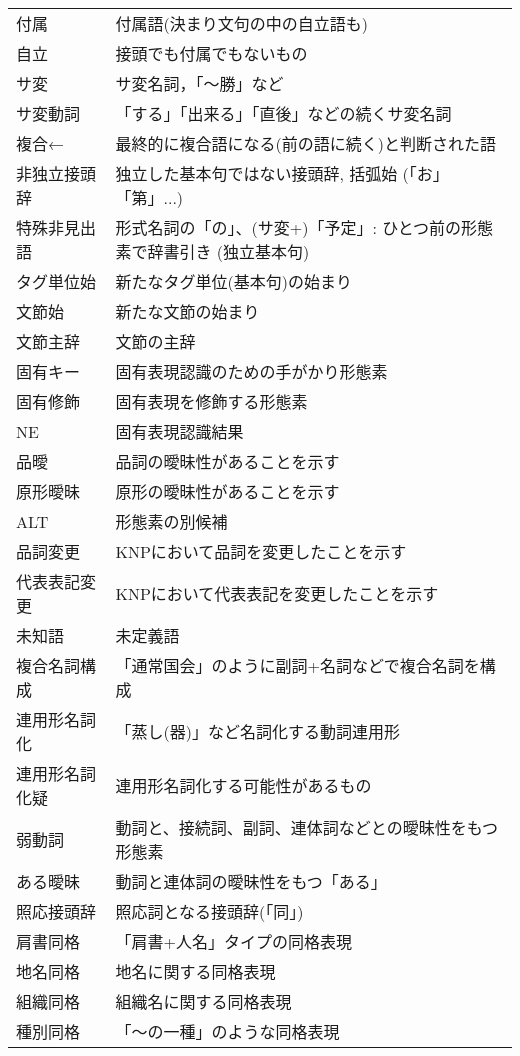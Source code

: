 \documentclass[a4j]{jarticle}
\begin{document}
\begin{supertabular}{p{4.2cm}p{9.6cm}}
付属 & 付属語(決まり文句の中の自立語も)\\
自立 & 接頭でも付属でもないもの\\
サ変 & サ変名詞，「〜勝」など\\
サ変動詞 & 「する」「出来る」「直後」などの続くサ変名詞\\
複合← &   最終的に複合語になる(前の語に続く)と判断された語\\
非独立接頭辞 & 独立した基本句ではない接頭辞, 括弧始 (「お」「第」...)\\
特殊非見出語 & 形式名詞の「の」、(サ変+)「予定」: ひとつ前の形態素で辞書引き (独立基本句)\\
タグ単位始 & 新たなタグ単位(基本句)の始まり\\
文節始 & 新たな文節の始まり\\
文節主辞 & 文節の主辞\\
固有キー & 固有表現認識のための手がかり形態素\\
固有修飾 & 固有表現を修飾する形態素\\
NE & 固有表現認識結果\\
品曖 & 品詞の曖昧性があることを示す\\
原形曖昧 & 原形の曖昧性があることを示す\\
ALT & 形態素の別候補\\
品詞変更 & KNPにおいて品詞を変更したことを示す\\
代表表記変更 & KNPにおいて代表表記を変更したことを示す\\
未知語 & 未定義語\\
複合名詞構成 & 「通常国会」のように副詞+名詞などで複合名詞を構成\\
連用形名詞化 & 「蒸し(器)」など名詞化する動詞連用形 \\
連用形名詞化疑 & 連用形名詞化する可能性があるもの \\
弱動詞 & 動詞と、接続詞、副詞、連体詞などとの曖昧性をもつ形態素\\
ある曖昧 & 動詞と連体詞の曖昧性をもつ「ある」\\
照応接頭辞 & 照応詞となる接頭辞(「同」)\\
肩書同格 & 「肩書+人名」タイプの同格表現\\
地名同格 & 地名に関する同格表現\\
組織同格 & 組織名に関する同格表現\\
種別同格 & 「〜の一種」のような同格表現\\
\end{supertabular}
\end{document}
